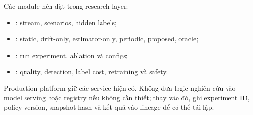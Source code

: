 Các module nên đặt trong research layer:

\begin{itemize}
  \item {}: stream, scenarios, hidden labels;
  \item {}: static, drift-only, estimator-only, periodic, proposed, oracle;
  \item {}: run experiment, ablation và configs;
  \item {}: quality, detection, label cost, retraining và safety.
\end{itemize}

Production platform giữ các service hiện có. Không đưa logic nghiên cứu vào model serving hoặc registry nếu không cần thiết; thay vào đó, ghi experiment ID, policy version, snapshot hash và kết quả vào lineage để có thể tái lập.
